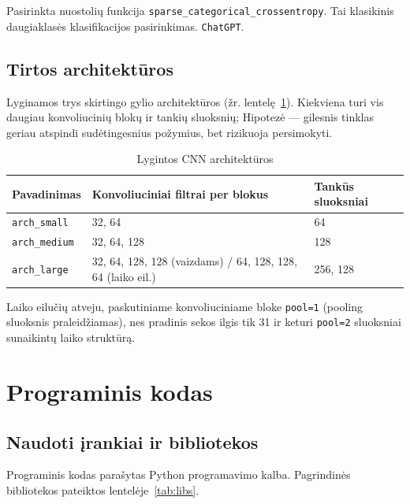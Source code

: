 \documentclass[]{VUMIFTemplateClass}
\begin{document}
Pasirinkta nuostolių funkcija \texttt{sparse\_categorical\_crossentropy}. Tai klasikinis daugiaklasės klasifikacijos pasirinkimas. \texttt{ChatGPT}.

\subsection{Tirtos architektūros}

Lyginamos trys skirtingo gylio architektūros (žr. lentelę~\ref{tab:archs}). Kiekviena turi vis daugiau konvoliucinių blokų ir tankių sluoksnių; Hipotezė --- gilesnis tinklas geriau atspindi sudėtingesnius požymius, bet rizikuoja persimokyti.

\begin{table}[H]
    \centering
    \caption{Lygintos CNN architektūros}
    \label{tab:archs}
    \begin{tabular}{|l|l|l|}
        \hline
        \textbf{Pavadinimas} & \textbf{Konvoliuciniai filtrai per blokus} & \textbf{Tankūs sluoksniai}\\
        \hline
        \texttt{arch\_small}  & 32, 64                  & 64        \\
        \hline
        \texttt{arch\_medium} & 32, 64, 128             & 128       \\
        \hline
        \texttt{arch\_large}  & 32, 64, 128, 128 (vaizdams) / 64, 128, 128, 64 (laiko eil.) & 256, 128 \\
        \hline
    \end{tabular}
\end{table}

Laiko eilučių atveju, paskutiniame konvoliuciniame bloke \texttt{pool=1} (pooling sluoksnis praleidžiamas), nes pradinis sekos ilgis tik 31 ir keturi \texttt{pool=2} sluoksniai sunaikintų laiko struktūrą.


\section{Programinis kodas}\label{sec:kodas}

\subsection{Naudoti įrankiai ir bibliotekos}

Programinis kodas parašytas Python programavimo kalba. Pagrindinės bibliotekos pateiktos lentelėje~\ref{tab:libs}.
\end{document}
